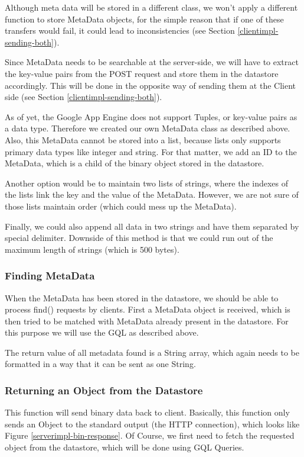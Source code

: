 Although meta data will be stored in a different class, we won't apply a
different function to store MetaData objects, for the simple reason that if one
of these transfers would fail, it could lead to inconsistencies (see Section
\ref{clientimpl-sending-both}).

Since MetaData needs to be searchable at the server-side, we will have to extract
the key-value pairs from the POST request and store them in the datastore
accordingly. This will be done in the opposite way of sending them at the Client
side (see Section \ref{clientimpl-sending-both}).

As of yet, the Google App Engine does not support Tuples, or key-value pairs as a
data type. Therefore we created our own MetaData class as described above. Also,
this MetaData cannot be stored into a list, because lists only supports primary
data types like integer and string. For that matter, we add an ID to the
MetaData, which is a child of the binary object stored in the datastore.

Another option would be to maintain two lists of strings, where the indexes of
the lists link the key and the value of the MetaData. However, we are not sure of
those lists maintain order (which could mess up the MetaData).

Finally, we could also append all data in two strings and have them separated by
special delimiter. Downside of this method is that we could run out of the
maximum length of strings (which is 500 bytes).

\subsubsection{Finding MetaData}
When the MetaData has been stored in the datastore, we should be able to process
find() requests by clients. First a MetaData object is received, which is then
tried to be matched with MetaData already present in the datastore. For this
purpose we will use the GQL as described above.

The return value of all metadata found is a String array, which again needs to be
formatted in a way that it can be sent as one String. 

\subsubsection{Returning an Object from the Datastore}
This function will send binary data back to client. Basically, this function only
sends an Object to the standard output (the HTTP connection), which looks like
Figure \ref{serverimpl-bin-response}. Of Course, we first need to fetch the
requested object from the datastore, which will be done using GQL Queries. 

